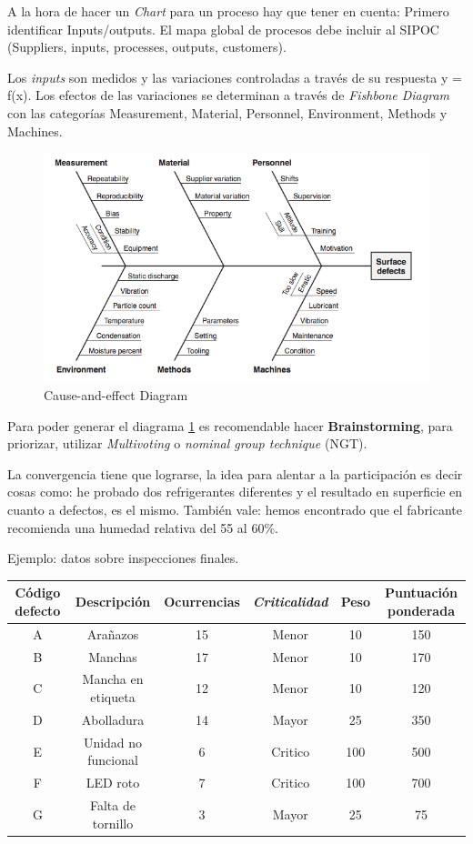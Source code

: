 \documentclass[oneside]{book}
\begin{document}
A la hora de hacer un \textit{Chart} para un proceso hay que tener en cuenta: Primero identificar Inputs/outputs. El mapa global de procesos debe incluir al SIPOC (Suppliers, inputs, processes, outputs, customers). 

Los \textit{inputs} son medidos y las variaciones controladas a través de su respuesta y = f(x). Los efectos de las variaciones se determinan a través de \textit{Fishbone Diagram} con las categorías Measurement, Material, Personnel, Environment, Methods y Machines.

\begin{figure}[ht!]
	\centering
	\includegraphics[width=120mm]{imagenes/Cause-and-effectDiagram.png}
	\caption{Cause-and-effect Diagram}
	\label{fig:CauseandeffectDiagram}
\end{figure}

Para poder generar el diagrama \ref{fig:CauseandeffectDiagram} es recomendable hacer \textbf{Brainstorming}, para priorizar, utilizar \textit{Multivoting} o \textit{nominal group technique} (NGT).

La convergencia tiene que lograrse, la idea para alentar a la participación es decir cosas como: he probado dos refrigerantes diferentes y el resultado en superficie en cuanto a defectos, es el mismo. También vale: hemos encontrado que el fabricante recomienda una humedad relativa del 55 al 60\%. 


{\large Ejemplo: datos sobre inspecciones finales.}

\begin{tabular}{|c|c|c|c|c|c|}
	\hline Código defecto & Descripción & Ocurrencias & \textit{Criticalidad} & Peso & Puntuación ponderada \\ 
	\hline A & Arañazos & 15 & Menor & 10 & 150 \\ 
	\hline B & Manchas & 17 & Menor & 10 & 170 \\ 
	\hline C & Mancha en etiqueta & 12 & Menor & 10 & 120 \\ 
	\hline D & Abolladura & 14 & Mayor & 25 & 350 \\ 
	\hline E & Unidad no funcional & 6 & Critico & 100 & 500 \\ 
	\hline F & LED roto & 7 & Critico & 100 & 700\\ 
	\hline G & Falta de tornillo & 3 & Mayor & 25 & 75 \\ 
	\hline 
\end{tabular} 
\end{document}
